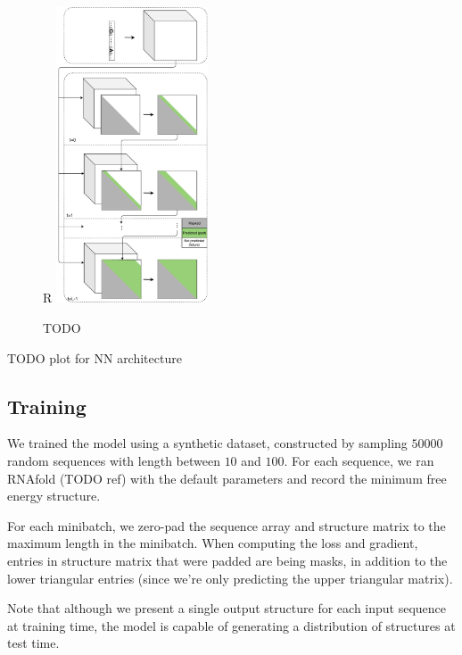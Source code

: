 \documentclass{article}
\begin{document}
\begin{figure}{R}
        \centering
        \includegraphics[width=0.4\textwidth]{plot/nn_arch_2.pdf}
        \caption{TODO}
        \label{fig:nn_arch_2}
        \centering
\end{figure}


TODO plot for NN architecture


\subsection{Training}

We trained the model using a synthetic dataset, constructed by sampling $50000$ random sequences with length
between $10$ and $100$.
For each sequence, we ran RNAfold (TODO ref) with the default parameters and
record the minimum free energy structure.

For each minibatch, we zero-pad the sequence array and structure matrix to the maximum length in the minibatch.
When computing the loss and gradient, entries in structure matrix that were padded are being masks,
in addition to the lower triangular entries (since we're only predicting the upper triangular matrix).

Note that although we present a single output structure for each input sequence at training time,
the model is capable of generating a distribution of structures at test time.
\end{document}

